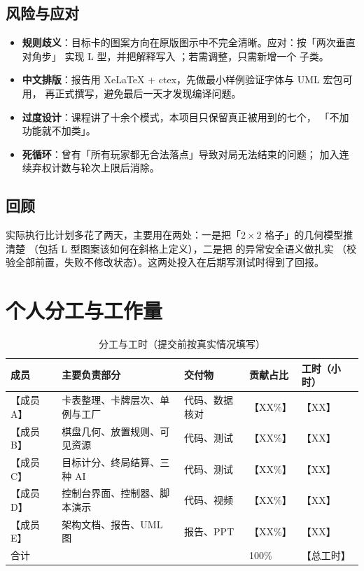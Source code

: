 \subsection{风险与应对}
\begin{itemize}
\item \textbf{规则歧义}：目标卡的图案方向在原版图示中不完全清晰。应对：按「两次垂直对角步」
      实现 L 型，并把解释写入 ；若需调整，只需新增一个
       子类。
\item \textbf{中文排版}：报告用 XeLaTeX + ctex，先做最小样例验证字体与 UML 宏包可用，
      再正式撰写，避免最后一天才发现编译问题。
\item \textbf{过度设计}：课程讲了十余个模式，本项目只保留真正被用到的七个，
      「不加功能就不加类」。
\item \textbf{死循环}：曾有「所有玩家都无合法落点」导致对局无法结束的问题；
      加入连续弃权计数与轮次上限后消除。
\end{itemize}

\subsection{回顾}
实际执行比计划多花了两天，主要用在两处：一是把「$2\times2$ 格子」的几何模型推清楚
（包括 L 型图案该如何在斜格上定义），二是把  的异常安全语义做扎实
（校验全部前置，失败不修改状态）。这两处投入在后期写测试时得到了回报。

\section{个人分工与工作量}
\begin{table}[h]
\centering
\small
\begin{tabular}{p{2.2cm}p{4.4cm}p{3.2cm}p{1.5cm}p{1.8cm}}
\toprule
成员 & 主要负责部分 & 交付物 & 贡献占比 & 工时（小时） \\
\midrule
【成员 A】 & 卡表整理、卡牌层次、单例与工厂 & 代码、数据核对 & 【XX\%】 & 【XX】 \\
【成员 B】 & 棋盘几何、放置规则、可见资源 & 代码、测试 & 【XX\%】 & 【XX】 \\
【成员 C】 & 目标计分、终局结算、三种 AI & 代码、测试 & 【XX\%】 & 【XX】 \\
【成员 D】 & 控制台界面、控制器、脚本演示 & 代码、视频 & 【XX\%】 & 【XX】 \\
【成员 E】 & 架构文档、报告、UML 图 & 报告、PPT & 【XX\%】 & 【XX】 \\
\midrule
合计 & & & 100\% & 【总工时】 \\
\bottomrule
\end{tabular}
\caption{分工与工时（提交前按真实情况填写）}
\label{tab:contrib}
\end{table}

